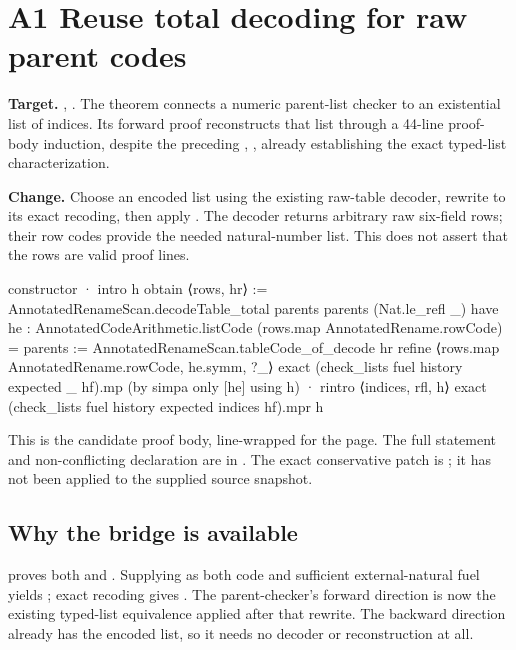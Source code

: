 \section{A1 Reuse total decoding for raw parent codes}
\label{sec:parents}

\textbf{Target.} ,
. The theorem connects a numeric parent-list checker to
an existential list of indices. Its forward proof reconstructs that list
through a 44-line proof-body induction, despite the preceding
, , already establishing
the exact typed-list characterization.

\textbf{Change.} Choose an encoded list using the existing raw-table decoder,
rewrite to its exact recoding, then apply . The decoder
returns arbitrary raw six-field rows; their row codes provide the needed
natural-number list. This does not assert that the rows are valid proof lines.

\begin{Lean}
  constructor
  · intro h
    obtain ⟨rows, hr⟩ :=
      AnnotatedRenameScan.decodeTable_total parents parents
        (Nat.le_refl _)
    have he : AnnotatedCodeArithmetic.listCode
        (rows.map AnnotatedRename.rowCode) = parents :=
      AnnotatedRenameScan.tableCode_of_decode hr
    refine ⟨rows.map AnnotatedRename.rowCode, he.symm, ?_⟩
    exact (check_lists fuel history expected _ hf).mp
      (by simpa only [he] using h)
  · rintro ⟨indices, rfl, h⟩
    exact (check_lists fuel history expected indices hf).mpr h
\end{Lean}

This is the candidate proof body, line-wrapped for the page. The full
statement and non-conflicting  declaration are in
. The exact conservative patch
is ; it has not been applied to the
supplied source snapshot.

\subsection{Why the bridge is available}

 proves both
 and . Supplying
 as both code and sufficient external-natural fuel yields
; exact recoding gives . The parent-checker's forward
direction is now the existing typed-list equivalence applied after that
rewrite. The backward direction already has the encoded list, so it needs
no decoder or reconstruction at all.

